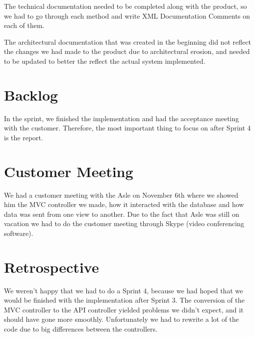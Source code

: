 The technical documentation needed to be completed along with the product, so we had to go through each method and write XML Documentation Comments on each of them.

The architectural documentation that was created in the beginning did not reflect the changes we had made to the product due to architectural erosion, and needed to be updated to better the reflect the actual system implemented.

\section{Backlog}
In the sprint, we finished the implementation and had the acceptance meeting with the customer. Therefore, the most important thing to focus on after Sprint 4 is the report.

\section{Customer Meeting}
We had a customer meeting with the Asle on November 6th where we showed him the MVC controller we made, how it interacted with the database and how data was sent from one view to another. Due to the fact that Asle was still on vacation we had to do the customer meeting through Skype (video conferencing software).

\section{Retrospective}
We weren't happy that we had to do a Sprint 4, because we had hoped that we would be finished with the implementation after Sprint 3. The conversion of the MVC controller to the API controller yielded problems we didn't expect, and it should have gone more smoothly. Unfortunately we had to rewrite a lot of the code due to big differences between the controllers.
